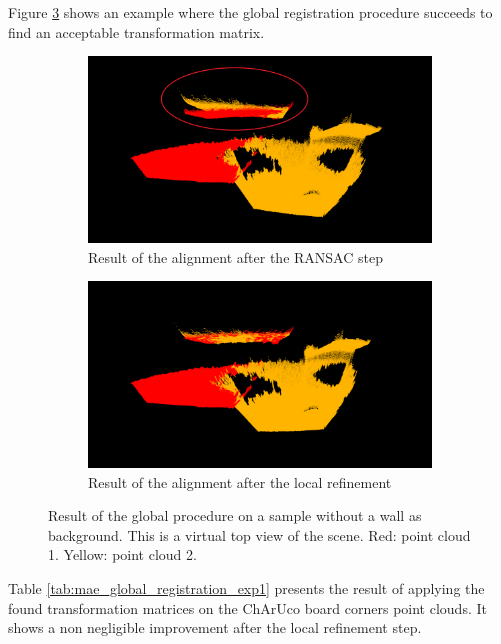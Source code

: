 Figure \ref{figure:ransac_ok} shows an example where the global registration procedure succeeds to find an acceptable transformation matrix.

\begin{figure}[H]
\centering
  \begin{subfigure}[b]{0.48 \textwidth}
    \includegraphics[width=\textwidth]{images/registration/ransac_ok_red.png}
    \caption{Result of the alignment after the RANSAC step}
    \label{figure:ransac_ok}
  \end{subfigure}
  \hfill
  \begin{subfigure}[b]{0.48 \textwidth}
    \includegraphics[width=\textwidth]{images/registration/ransac_icp_ok.png}
    \caption{Result of the alignment after the local refinement}
    \label{figure:ransac_icp_ok}
  \end{subfigure}
  \caption{Result of the global procedure on a sample without a wall as background. This is a virtual top view of the scene. Red: point cloud 1. Yellow: point cloud 2.}
  \label{figure:ransac_ok}
\end{figure}

Table \ref{tab:mae_global_registration_exp1} presents the result of applying the found transformation matrices on the  ChArUco board corners point clouds. It shows a non negligible improvement after the local refinement step.

